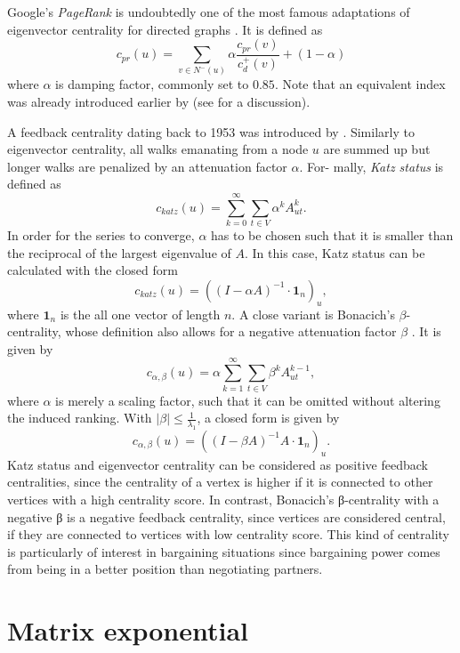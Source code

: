 \documentclass[]{book}
\theoremstyle{definition}
\theoremstyle{definition}
\theoremstyle{definition}
\theoremstyle{remark}
\begin{document}
Google's \emph{PageRank} is undoubtedly one of the most famous
adaptations of eigenvector centrality for directed graphs
\citep{pbmw-pcrbow-99}. It is defined as \[
c_{pr}(u)=\sum\limits_{v \in N^-(u)} \alpha \frac{c_{pr}(v)}{c_d^+(v)}+ (1-\alpha)
\] where \(\alpha\) is damping factor, commonly set to \(0.85\). Note
that an equivalent index was already introduced earlier by
\citet{fj-sio-90} (see \citet{fj-tso-14} for a discussion).

A feedback centrality dating back to 1953 was introduced by
\citet{k-nsidsa-53}. Similarly to eigenvector centrality, all walks
emanating from a node \(u\) are summed up but longer walks are penalized
by an attenuation factor \(\alpha\). For- mally, \emph{Katz status} is
defined as \[
c_{katz}(u)=\sum\limits_{k=0}^\infty \sum_{t \in V} \alpha^k A^k_{ut}.
\] In order for the series to converge, \(\alpha\) has to be chosen such
that it is smaller than the reciprocal of the largest eigenvalue of
\(A\). In this case, Katz status can be calculated with the closed form
\[
c_{katz}(u)=\left( (I-\alpha A)^{-1}\cdot \boldsymbol{1}_n\right)_u,
\] where \(\boldsymbol{1}_n\) is the all one vector of length \(n\). A
close variant is Bonacich's \(\beta\)-centrality, whose definition also
allows for a negative attenuation factor \(\beta\) \citep{b-fwassci-72}.
It is given by \[
c_{\alpha,\beta}(u) = \alpha\sum\limits_{k=1}^\infty \sum_{t \in V} \beta^k A^{k-1}_{ut},
\] where \(\alpha\) is merely a scaling factor, such that it can be
omitted without altering the induced ranking. With
\(|\beta| \leq \frac{1}{\lambda_1}\), a closed form is given by \[
c_{\alpha,\beta}(u) = \left((I-\beta A)^{-1}A \cdot \boldsymbol{1}_n\right)_u.
\] Katz status and eigenvector centrality can be considered as positive
feedback centralities, since the centrality of a vertex is higher if it
is connected to other vertices with a high centrality score. In
contrast, Bonacich's β-centrality with a negative β is a negative
feedback centrality, since vertices are considered central, if they are
connected to vertices with low centrality score. This kind of centrality
is particularly of interest in bargaining situations since bargaining
power comes from being in a better position than negotiating partners.

\hypertarget{matrix-exponential}{%
\section{Matrix exponential}\label{matrix-exponential}}
\end{document}

